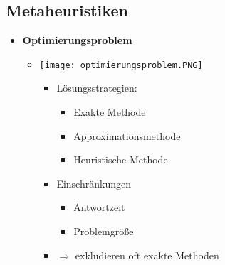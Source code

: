 \subsection{Metaheuristiken}
    \begin{itemize}
        \item \textbf{Optimierungsproblem}
            \begin{itemize}
                \item[]
                    \begin{minipage}{0.4\textwidth}
                        \texttt{[image: optimierungsproblem.PNG]}
                    \end{minipage}
                    \begin{minipage}{0.5\textwidth}
                        \begin{itemize}
                            \item Lösungsstrategien:
                                \begin{itemize}
                                    \item Exakte Methode
                                    \item Approximationsmethode
                                    \item Heuristische Methode
                                \end{itemize}
                            \item Einschränkungen
                                \begin{itemize}
                                    \item Antwortzeit
                                    \item Problemgröße
                                \end{itemize}
                            \item[] $\Rightarrow$ exkludieren oft exakte Methoden
                        \end{itemize}
                    \end{minipage}
            \end{itemize}
        

\end{itemize}
